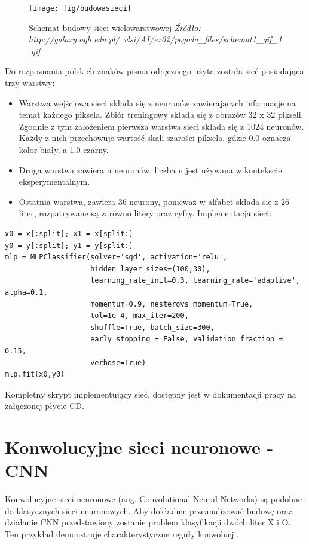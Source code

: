 \documentclass[brudnopis]{xmgr}
\begin{document}
\begin{figure}[!tbh]
\centering
\texttt{[image: fig/budowasieci]}
\caption{Schemat budowy sieci wielowarstwowej \emph{Źródło: http://galaxy.agh.edu.pl/~vlsi/AI/ex02/pogoda\_files/schemat1\_gif\_1.gif}}
\end{figure}

Do rozpoznania polskich znaków pisma odręcznego użyta została sieć posiadająca trzy warstwy:

\begin{itemize}
\item
Warstwa wejściowa sieci składa się z neuronów zawierających informacje na temat każdego piksela. Zbiór treningowy składa się z obrazów 32 x 32 pikseli. Zgodnie z tym założeniem pierwsza warstwa sieci składa się z 1024 neuronów. Każdy z nich przechowuje wartość skali szarości piksela, gdzie 0.0 oznacza kolor biały, a 1.0 czarny.
\item
Druga warstwa zawiera n neuronów, liczba n jest używana w kontekscie eksperymentalnym.
\item
Ostatnia warstwa, zawiera 36 neurony, ponieważ w alfabet składa się z 26 liter, rozpatrywane są zarówno litery oraz cyfry. Implementacja sieci:
\end{itemize}

\begin{verbatim}
x0 = x[:split]; x1 = x[split:]
y0 = y[:split]; y1 = y[split:]
mlp = MLPClassifier(solver='sgd', activation='relu',
                    hidden_layer_sizes=(100,30),
                    learning_rate_init=0.3, learning_rate='adaptive', alpha=0.1,
                    momentum=0.9, nesterovs_momentum=True,
                    tol=1e-4, max_iter=200,
                    shuffle=True, batch_size=300,
                    early_stopping = False, validation_fraction = 0.15,
                    verbose=True)
mlp.fit(x0,y0)
\end{verbatim}

Kompletny skrypt implementujący sieć, dostępny jest w dokumentacji pracy na załączonej płycie CD.
\newpage

\section{Konwolucyjne sieci neuronowe - CNN}

Konwolucyjne sieci neuronowe (ang. Convolutional Neural Networks)\cite{14} są podobne do klasycznych sieci neuronowych. Aby dokładnie przeanalizować budowę oraz działanie CNN przedstawiony zostanie problem klasyfikacji dwóch liter X i O. Ten przykład demonstruje charakterystyczne reguły konwolucji.
\end{document}
